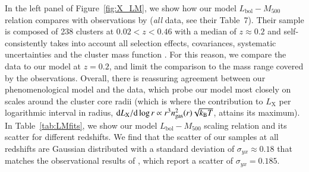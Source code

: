 \documentclass[traditabstract]{aa}
\newcommand{\rmn}{\mathrm}
\newcommand{\dd}{\mathrm{d}}
\begin{document}
In the left panel of Figure~\ref{fig:X_LM}, we show how our model
$L_{\rmn{bol}}-M_{500}$ relation compares with observations by
\cite{2010MNRAS.406.1773M} (\emph{all} data, see their Table~7). Their sample is
composed of 238 clusters at $0.02<z<0.46$ with a median of $z \approx 0.2$ and
self-consistently takes into account all selection effects, covariances,
systematic uncertainties and the cluster mass function \citep{2010MNRAS.406.1759M}. 
For this reason, we compare the \cite{2010MNRAS.406.1773M} data to our model at $z=0.2$, 
and limit the comparison to the mass range covered by the observations. Overall, there is
reassuring agreement between our phenomenological model and the data, which
probe our model most closely on scales around the cluster core radii (which is
where the contribution to $L_{\rmn{X}}$ per logarithmic interval in radius, $\dd
L_{\rmn{X}}/\dd\log r \propto r^3 n_{\rm{gas}}^2(r) \sqrt{k_{\rmn{B}}T}$, attains its maximum).  In
Table~\ref{tab:LMfits}, we show our model $L_{\rmn{bol}}-M_{500}$ scaling
relation and its scatter for different redshifts. We find that the scatter of
our samples at all redshifts are Gaussian distributed with a standard deviation
of $\sigma_{yx} \approx 0.18$ that matches the observational results of
\cite{2010MNRAS.406.1773M}, which report a scatter of $\sigma_{yx} = 0.185$.
\end{document}
